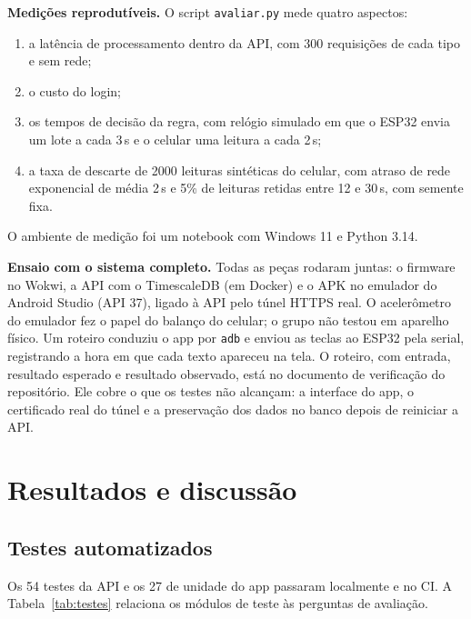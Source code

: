 \documentclass[12pt,a4paper]{article}
\begin{document}
\textbf{Medições reprodutíveis.}
O script \texttt{avaliar.py} mede quatro aspectos:
\begin{enumerate}[label=(\alph*)]
  \item a latência de processamento dentro da API, com 300 requisições de cada tipo e sem rede;
  \item o custo do login;
  \item os tempos de decisão da regra, com relógio simulado em que o ESP32 envia um lote a cada 3\,s e o celular uma leitura a cada 2\,s;
  \item a taxa de descarte de 2000 leituras sintéticas do celular, com atraso de rede exponencial de média 2\,s e 5\% de leituras retidas entre 12 e 30\,s, com semente fixa.
\end{enumerate}
O ambiente de medição foi um notebook com Windows 11 e Python 3.14.

\textbf{Ensaio com o sistema completo.}
Todas as peças rodaram juntas: o firmware no Wokwi, a API com o TimescaleDB (em Docker) e o APK no emulador do Android Studio (API 37), ligado à API pelo túnel HTTPS real.
O acelerômetro do emulador fez o papel do balanço do celular; o grupo não testou em aparelho físico.
Um roteiro conduziu o app por \texttt{adb} e enviou as teclas ao ESP32 pela serial, registrando a hora em que cada texto apareceu na tela.
O roteiro, com entrada, resultado esperado e resultado observado, está no documento de verificação do repositório.
Ele cobre o que os testes não alcançam: a interface do app, o certificado real do túnel e a preservação dos dados no banco depois de reiniciar a API.

\section{Resultados e discussão}\label{sec:result}

\subsection{Testes automatizados}

Os 54 testes da API e os 27 de unidade do app passaram localmente e no CI.
A Tabela~\ref{tab:testes} relaciona os módulos de teste às perguntas de avaliação.
\end{document}
